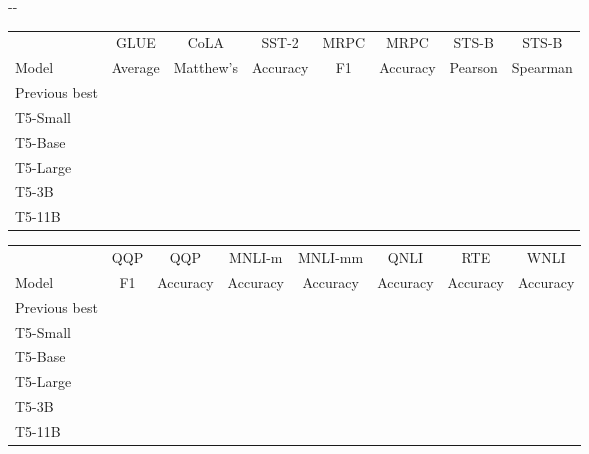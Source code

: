 \documentclass[twoside,11pt]{article}
\newlength{\offsetpage}
\newenvironment{widepage}{\begin{adjustwidth}{-\offsetpage}{-\offsetpage}\addtolength{\textwidth}{2\offsetpage}}{\end{adjustwidth}}
\newcommand{\xa}{\makebox[0pt][l]{}}
\newcommand{\xb}{\makebox[0pt][l]{}}
\newcommand{\xc}{\makebox[0pt][l]{}}
\begin{document}
\begin{table}
\footnotesize
\begin{widepage}
\centering

\begin{tabular}{l c c c c c c c}
\toprule
                  & GLUE       & CoLA       & SST-2         & MRPC          & MRPC          & STS-B         & STS-B    \\
    Model         & Average    & Matthew's  & Accuracy      & F1            & Accuracy      & Pearson       & Spearman \\
\cmidrule(r){1-1}
\cmidrule(l){2-8}
    Previous best & \xa  & \xb     & \xa    & \xb & \xb  & \xb  & \xb   \\
T5-Small      &      &         &         &         &         &      &       \\
    T5-Base       &      &         &         &         &         &      &       \\
    T5-Large      &      &         &         &         &         &      &       \\
    T5-3B         &      &         &         &         &         &      &       \\
    T5-11B        &  &     &     &         &         &  &   \\
\bottomrule
\end{tabular}

\vspace{0.2em}

\begin{tabular}{l c c c c c c c}
                  & QQP           & QQP           & MNLI-m     & MNLI-mm     & QNLI         & RTE       & WNLI     \\
    Model         & F1            & Accuracy      & Accuracy   & Accuracy    & Accuracy     & Accuracy  & Accuracy \\
\cmidrule(r){1-1}
\cmidrule(l){2-8}
    Previous best & \xc     & \xb & \xa  & \xa  & \xa & \xa  & \xa \\
T5-Small      &         &         &      &      &        &      &         \\
    T5-Base       &         &         &      &      &        &      &         \\
    T5-Large      &         &         &      &      &        &      &         \\
    T5-3B         &         &         &      &      &        &      &         \\
    T5-11B        &     &         &  &  &        &  &     \\
\bottomrule
\end{tabular}


\end{widepage}
\end{table}
\end{document}
